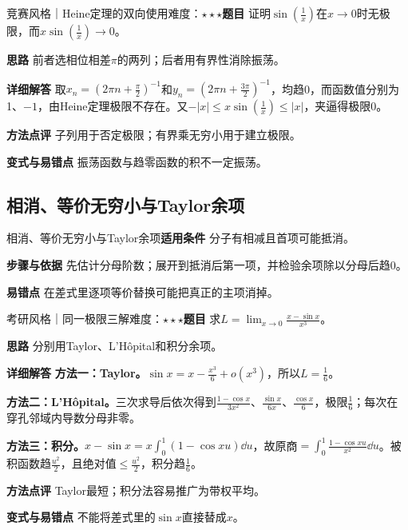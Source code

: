 \begin{example}{竞赛风格｜Heine定理的双向使用}{难度：$\star\star\star$}\label{deep:ex:limits_source_deep:heine}\textbf{题目} 证明$\sin(\frac{1}{x})$在$x\to0$时无极限，而$x\sin(\frac{1}{x})\to0$。\par\textbf{思路} 前者选相位相差$\pi$的两列；后者用有界性消除振荡。\par\textbf{详细解答} 取$x_n=(2\pi n+\frac{\pi}{2})^{-1}$和$y_n=(2\pi n+\frac{3\pi}{2})^{-1}$，均趋0，而函数值分别为1、$-1$，由Heine定理极限不存在。又$-|x|\le x\sin(\frac{1}{x})\le|x|$，夹逼得极限0。\par\textbf{方法点评} 子列用于否定极限；有界乘无穷小用于建立极限。\par\textbf{变式与易错点} 振荡函数与趋零函数的积不一定振荡。\end{example}

\subsection{相消、等价无穷小与Taylor余项}\label{deep:limits_source_deep:cancel}

\begin{method}{相消、等价无穷小与Taylor余项}\textbf{适用条件} 分子有相减且首项可能抵消。\par\textbf{步骤与依据} 先估计分母阶数；展开到抵消后第一项，并检验余项除以分母后趋0。\par\textbf{易错点} 在差式里逐项等价替换可能把真正的主项消掉。\end{method}

\begin{example}{考研风格｜同一极限三解}{难度：$\star\star\star$}\label{deep:ex:limits_source_deep:sin}\textbf{题目} 求$L=\lim_{x\to0}\frac{x-\sin x}{x^3}$。\par\textbf{思路} 分别用Taylor、L’Hôpital和积分余项。\par\textbf{详细解答} \textbf{方法一：Taylor。}$\sin x=x-\frac{x^3}{6}+o(x^3)$，所以$L=\frac{1}{6}$。\par\textbf{方法二：L’Hôpital。}三次求导后依次得到$\frac{1-\cos x}{3x^2}$、$\frac{\sin x}{6x}$、$\frac{\cos x}{6}$，极限$\frac{1}{6}$；每次在穿孔邻域内导数分母非零。\par\textbf{方法三：积分。}$x-\sin x=x\int_0^1(1-\cos xu)\dd u$，故原商$=\int_0^1\frac{1-\cos xu}{x^2}\dd u$。被积函数趋$\frac{u^2}{2}$，且绝对值$\le \frac{u^2}{2}$，积分趋$\frac{1}{6}$。\par\textbf{方法点评} Taylor最短；积分法容易推广为带权平均。\par\textbf{变式与易错点} 不能将差式里的$\sin x$直接替成$x$。\end{example}

